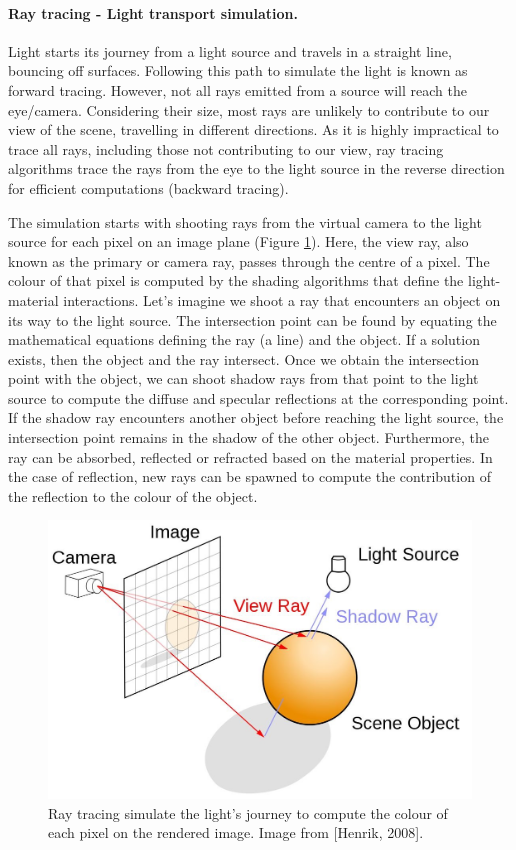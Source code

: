 \paragraph{Ray tracing - Light transport simulation.}

Light starts its journey from a light source and travels in a straight line, bouncing off surfaces. Following this path to simulate the light is known as forward tracing. However, not all rays emitted from a source will reach the eye/camera. Considering their size, most rays are unlikely to contribute to our view of the scene, travelling in different directions. As it is highly impractical to trace all rays, including those not contributing to our view, ray tracing algorithms trace the rays from the eye to the light source in the reverse direction for efficient computations (backward tracing).

The simulation starts with shooting rays from the virtual camera to the light source for each pixel on an image plane (Figure \ref{fig:raytracing}). Here, the view ray, also known as the primary or camera ray, passes through the centre of a pixel. The colour of that pixel is computed by the shading algorithms that define the light-material interactions. Let's imagine we shoot a ray that encounters an object on its way to the light source. The intersection point can be found by equating the mathematical equations defining the ray (a line) and the object. If a solution exists, then the object and the ray intersect. Once we obtain the intersection point with the object, we can shoot shadow rays from that point to the light source to compute the diffuse and specular reflections at the corresponding point. If the shadow ray encounters another object before reaching the light source,  the intersection point remains in the shadow of the other object. Furthermore, the ray can be absorbed, reflected or refracted based on the material properties. In the case of reflection, new rays can be spawned to compute the contribution of the reflection to the colour of the object.


\begin{figure}
  \centering
   \includegraphics[width=\linewidth]{Images/ray-tracing-image-1.jpg}
   \caption{Ray tracing simulate the light's journey to compute the colour of each pixel on the rendered image. Image from [Henrik, 2008].}
   \label{fig:raytracing}
\end{figure}

